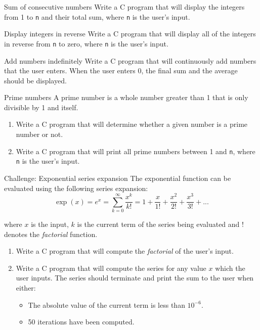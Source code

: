 \documentclass{pass}
\begin{document}
\begin{task}{Sum of consecutive numbers}{}
Write a C program that will display the integers from 1 to \texttt{n} and their total sum, where \texttt{n} is the user's input.
\end{task}

\begin{task}{Display integers in reverse}{}
Write a C program that will display all of the integers in reverse from \texttt{n} to zero, where \texttt{n} is the user's input.
\end{task}

\begin{task}{Add numbers indefinitely}{}
Write a C program that will continuously add numbers that the user enters. When the user enters 0, the final sum and the average should be displayed.
\end{task}

\begin{task}{Prime numbers}{}
A prime number is a whole number greater than 1 that is only divisible by 1 and itself. \\[12pt]
	\begin{enumerate}
	\item Write a C program that will determine whether a given number is a prime number or not. \\[12pt]
	\item Write a C program that will print all prime numbers between 1 and \texttt{n}, where \texttt{n} is the user's input. \\[12pt]
	\end{enumerate}
\end{task}

\begin{task}{Challenge: Exponential series expansion}{}
The exponential function can be evaluated using the following series expansion:
\begin{equation*}
\exp(x) = e^x = \displaystyle\sum^\infty_{k=0}\dfrac{x^k}{k!} = 1 + \dfrac{x}{1!} + \dfrac{x^2}{2!} + \dfrac{x^3}{3!} + ...
\end{equation*}

where $x$ is the input, $k$ is the current term of the series being evaluated and $!$ denotes the \textit{factorial} function. \\[12pt]

	\begin{enumerate}
	\item Write a C program that will compute the \textit{factorial} of the user's input. \\[12pt]
	\item Write a C program that will compute the series for any value $x$ which the user inputs. The series should terminate and print the sum to the user when either:
\begin{itemize}
\item The absolute value of the current term is less than $10^{-6}$.
\item 50 iterations have been computed.
\end{itemize}
	\end{enumerate}
\end{task}
\end{document}
